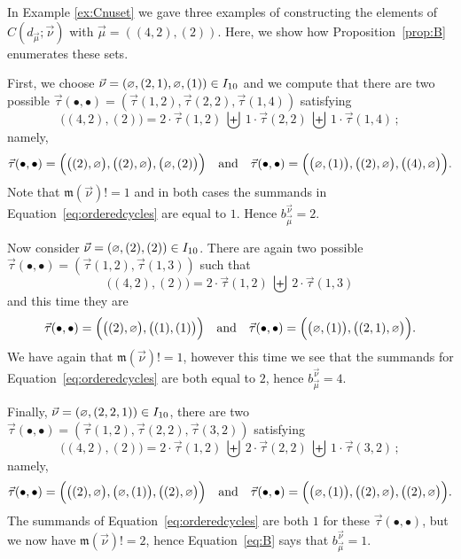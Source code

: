 \documentclass[ALCO,Unicode]{cedram}
\newcommand{\epart}{\text{\footnotesize$\varnothing$}}
\begin{document}
\begin{example}  In Example \ref{ex:Cnuset} we gave three examples of
constructing the elements of $C( d_{\vec{\mu}}; \vec{\nu})$ with $\vec{\mu} = ((4,2), (2))$.
Here, we show
how Proposition~\ref{prop:B} enumerates these sets.

First, we choose $\vec{\nu} = (\epart, (2,1), \epart, (1)) \in I_{10}$
and we compute that there are two possible
$\vec{\tau}(\bullet, \bullet) = (\vec{\tau}(1,2), \vec{\tau}(2,2), \vec{\tau}(1,4))$
satisfying
\[
    \big((4, 2), (2)\big) =
    2 \cdot \vec{\tau}(1,2)~\biguplus~1 \cdot \vec{\tau}(2,2)~\biguplus~1 \cdot \vec{\tau}(1,4) \,;
\]
namely,
\begin{equation*}
    \vec{\tau}(\bullet, \bullet) = \Big(\big((2), \epart\big), \big((2), \epart\big), \big(\epart, (2)\big)\Big)
    \quad\text{and}\quad
    \vec{\tau}(\bullet, \bullet) = \Big(\big(\epart, (1)\big), \big((2), \epart \big), \big((4), \epart\big)\Big).
\end{equation*}
Note that $\mathfrak{m}(\vec{\nu})! = 1$ and in both cases
the summands in Equation~\eqref{eq:orderedcycles} are equal to $1$.
Hence $b_{\vec{\mu}}^{\vec{\nu}} = 2$.

Now consider $\vec{\nu} = (\epart, (2), (2)) \in I_{10}$.
There are again two possible $\vec{\tau}(\bullet, \bullet) = (\vec{\tau}(1,2), \vec{\tau}(1,3))$
such that
\[
\big((4, 2), (2)\big) = 2 \cdot \vec{\tau}(1,2)~\biguplus~2 \cdot \vec{\tau}(1,3)
\]
and this time they are
\begin{equation*}
    \vec{\tau}(\bullet, \bullet) = \Big(\big((2), \epart\big), \big((1), (1)\big)\Big)
    \quad\text{and}\quad
    \vec{\tau}(\bullet, \bullet) = \Big(\big(\epart, (1)\big), \big((2, 1), \epart\big)\Big).
\end{equation*}
We have again that $\mathfrak{m}(\vec{\nu})! = 1$,
however this time we see that the summands for Equation~\eqref{eq:orderedcycles}
are both equal to $2$, hence $b_{\vec{\mu}}^{\vec{\nu}} = 4$.

Finally,
$\vec{\nu} = (\epart, (2,2,1)) \in I_{10}$, there are two
$\vec{\tau}(\bullet, \bullet) = (\vec{\tau}(1,2), \vec{\tau}(2,2), \vec{\tau}(3,2))$ satisfying
\[
\big((4, 2), (2)\big) =
2 \cdot \vec{\tau}(1,2)~\biguplus~2 \cdot \vec{\tau}(2,2)~\biguplus~1 \cdot \vec{\tau}(3,2) \,;
\]
namely,
\begin{equation*}
    \vec{\tau}(\bullet, \bullet) = \Big(\big((2), \epart\big), \big(\epart, (1)\big), \big((2), \epart\big)\Big)
    \quad\text{and}\quad
    \vec{\tau}(\bullet, \bullet) = \Big(\big(\epart, (1)\big), \big((2), \epart \big), \big((2), \epart\big)\Big).
\end{equation*}
The summands of Equation~\eqref{eq:orderedcycles} are both $1$ for these $\vec{\tau}(\bullet, \bullet)$,
but we now have $\mathfrak{m}(\vec{\nu})! = 2$,
hence Equation~\eqref{eq:B} says that $b_{\vec{\mu}}^{\vec{\nu}} = 1$.
\end{example}
\end{document}
